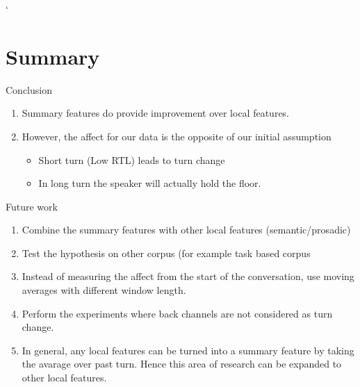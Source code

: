 `%

\section{Summary}
\frame{\sectionpage}

\begin{frame}{Conclusion}
   \begin{enumerate}[<+->]\itemsep9pt
      \item Summary features do provide improvement over local features. 
      \item However, the affect for our data is the opposite of our initial assumption
              \begin{itemize}
                \item Short turn (Low RTL) leads to turn change
                \item In long turn the speaker will actually hold the floor.
               \end{itemize}
    \end{enumerate}
\end{frame}{}

\begin{frame}{Future work}
   \begin{enumerate}[<+->]\itemsep9pt
      \item Combine the summary features with other local features (semantic/prosadic)
      \item Test the hypothesis on other corpus (for example task based corpus
      \item Instead of measuring the affect from the start of the conversation, use moving averages with different window length.
      \item Perform the experiments where back channels are not considered as turn change. 
      \item In general, any local features can be turned into a summary feature by taking the avarage
            over past turn. Hence this area of research can be expanded to other local features.
      
          
    \end{enumerate}
\end{frame}{}
